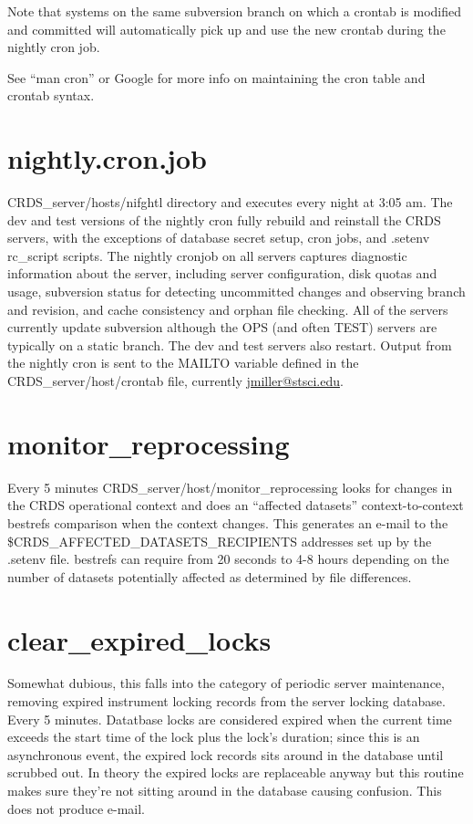 \documentclass[letterpaper,10pt,english]{sphinxmanual}
\begin{document}
Note that systems on the same subversion branch on which a crontab is modified and committed will automatically pick
up and use the new crontab during the nightly cron job.

See ``man cron'' or Google for more info on maintaining the cron table and crontab syntax.


\section{nightly.cron.job}
\label{server_guide:nightly-cron-job}
CRDS\_server/hosts/nifghtl directory and executes every night at 3:05 am.  The dev and test versions
of the nightly cron fully rebuild and reinstall the CRDS servers,  with the exceptions of database secret setup,
cron jobs, and .setenv rc\_script scripts.   The nightly cronjob on all servers captures diagnostic information about
the server,  including server configuration, disk quotas and usage, subversion status for detecting uncommitted
changes and observing branch and revision, and cache consistency and orphan file checking.   All of the servers
currently update subversion although the OPS (and often TEST) servers are typically on a static branch.   The dev
and test servers also restart.  Output from the nightly cron is sent to the MAILTO variable defined in the
CRDS\_server/host/crontab file,  currently \href{mailto:jmiller@stsci.edu}{jmiller@stsci.edu}.


\section{monitor\_reprocessing}
\label{server_guide:monitor-reprocessing}
Every 5 minutes CRDS\_server/host/monitor\_reprocessing looks for changes in the CRDS operational context and
does an ``affected datasets'' context-to-context bestrefs comparison when the context changes.   This generates
an e-mail to the \$CRDS\_AFFECTED\_DATASETS\_RECIPIENTS addresses set up by the .setenv file.   bestrefs can require
from 20 seconds to 4-8 hours depending on the number of datasets potentially affected as determined by file
differences.


\section{clear\_expired\_locks}
\label{server_guide:clear-expired-locks}
Somewhat dubious,  this falls into the category of periodic server maintenance,  removing expired instrument locking
records from the server locking database.   Every 5 minutes.  Datatbase locks are considered expired when the current
time exceeds the start time of the lock plus the lock's duration;  since this is an asynchronous event,  the expired
lock records sits around in the database until scrubbed out.   In theory the expired locks are replaceable anyway
but this  routine makes sure they're not sitting around in the database causing confusion.  This does not produce e-mail.
\end{document}
